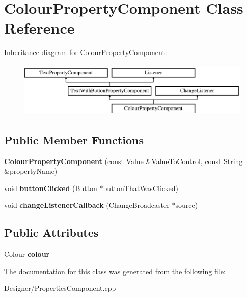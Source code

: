 \hypertarget{class_colour_property_component}{\section{Colour\-Property\-Component Class Reference}
\label{class_colour_property_component}
}
Inheritance diagram for Colour\-Property\-Component\-:\begin{figure}[H]
\begin{center}
\leavevmode
\includegraphics[height=2.616822cm]{class_colour_property_component}
\end{center}
\end{figure}
\subsection*{Public Member Functions}
\begin{DoxyCompactItemize}
\item 
\hypertarget{class_colour_property_component_a66a36b844a4615df46ee22ef23312dd3}{{\bfseries Colour\-Property\-Component} (const Value \&Value\-To\-Control, const String \&property\-Name)}\label{class_colour_property_component_a66a36b844a4615df46ee22ef23312dd3}

\item 
\hypertarget{class_colour_property_component_ac4cba912636746ed27d69873f4699855}{void {\bfseries button\-Clicked} (Button $\ast$button\-That\-Was\-Clicked)}\label{class_colour_property_component_ac4cba912636746ed27d69873f4699855}

\item 
\hypertarget{class_colour_property_component_a6799c4e985e7907485d3e45721d1011c}{void {\bfseries change\-Listener\-Callback} (Change\-Broadcaster $\ast$source)}\label{class_colour_property_component_a6799c4e985e7907485d3e45721d1011c}

\end{DoxyCompactItemize}
\subsection*{Public Attributes}
\begin{DoxyCompactItemize}
\item 
\hypertarget{class_colour_property_component_a3420be208116eb02d4a9c9d661249a00}{Colour {\bfseries colour}}\label{class_colour_property_component_a3420be208116eb02d4a9c9d661249a00}

\end{DoxyCompactItemize}


The documentation for this class was generated from the following file\-:\begin{DoxyCompactItemize}
\item 
Designer/Properties\-Component.\-cpp\end{DoxyCompactItemize}
